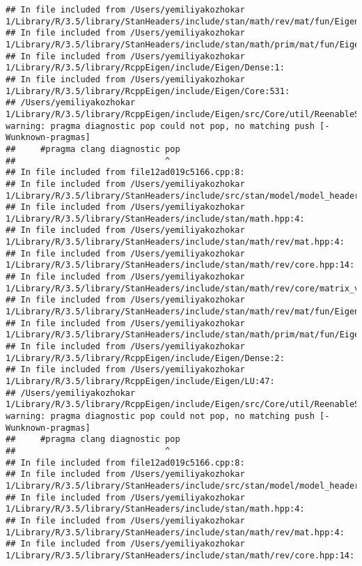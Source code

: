 \documentclass[]{article}
\begin{document}
\begin{verbatim}
## In file included from /Users/yemiliyakozhokar 1/Library/R/3.5/library/StanHeaders/include/stan/math/rev/mat/fun/Eigen_NumTraits.hpp:4:
## In file included from /Users/yemiliyakozhokar 1/Library/R/3.5/library/StanHeaders/include/stan/math/prim/mat/fun/Eigen.hpp:4:
## In file included from /Users/yemiliyakozhokar 1/Library/R/3.5/library/RcppEigen/include/Eigen/Dense:1:
## In file included from /Users/yemiliyakozhokar 1/Library/R/3.5/library/RcppEigen/include/Eigen/Core:531:
## /Users/yemiliyakozhokar 1/Library/R/3.5/library/RcppEigen/include/Eigen/src/Core/util/ReenableStupidWarnings.h:10:30: warning: pragma diagnostic pop could not pop, no matching push [-Wunknown-pragmas]
##     #pragma clang diagnostic pop
##                              ^
## In file included from file12ad019c5166.cpp:8:
## In file included from /Users/yemiliyakozhokar 1/Library/R/3.5/library/StanHeaders/include/src/stan/model/model_header.hpp:4:
## In file included from /Users/yemiliyakozhokar 1/Library/R/3.5/library/StanHeaders/include/stan/math.hpp:4:
## In file included from /Users/yemiliyakozhokar 1/Library/R/3.5/library/StanHeaders/include/stan/math/rev/mat.hpp:4:
## In file included from /Users/yemiliyakozhokar 1/Library/R/3.5/library/StanHeaders/include/stan/math/rev/core.hpp:14:
## In file included from /Users/yemiliyakozhokar 1/Library/R/3.5/library/StanHeaders/include/stan/math/rev/core/matrix_vari.hpp:4:
## In file included from /Users/yemiliyakozhokar 1/Library/R/3.5/library/StanHeaders/include/stan/math/rev/mat/fun/Eigen_NumTraits.hpp:4:
## In file included from /Users/yemiliyakozhokar 1/Library/R/3.5/library/StanHeaders/include/stan/math/prim/mat/fun/Eigen.hpp:4:
## In file included from /Users/yemiliyakozhokar 1/Library/R/3.5/library/RcppEigen/include/Eigen/Dense:2:
## In file included from /Users/yemiliyakozhokar 1/Library/R/3.5/library/RcppEigen/include/Eigen/LU:47:
## /Users/yemiliyakozhokar 1/Library/R/3.5/library/RcppEigen/include/Eigen/src/Core/util/ReenableStupidWarnings.h:10:30: warning: pragma diagnostic pop could not pop, no matching push [-Wunknown-pragmas]
##     #pragma clang diagnostic pop
##                              ^
## In file included from file12ad019c5166.cpp:8:
## In file included from /Users/yemiliyakozhokar 1/Library/R/3.5/library/StanHeaders/include/src/stan/model/model_header.hpp:4:
## In file included from /Users/yemiliyakozhokar 1/Library/R/3.5/library/StanHeaders/include/stan/math.hpp:4:
## In file included from /Users/yemiliyakozhokar 1/Library/R/3.5/library/StanHeaders/include/stan/math/rev/mat.hpp:4:
## In file included from /Users/yemiliyakozhokar 1/Library/R/3.5/library/StanHeaders/include/stan/math/rev/core.hpp:14:

\end{verbatim}
\end{document}
